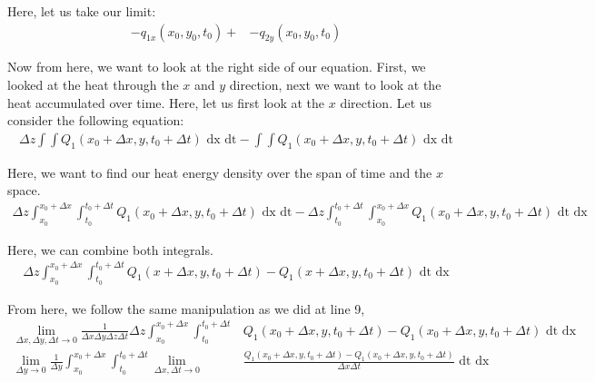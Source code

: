 \documentclass{article}
\begin{document}
\begin{enumerate}
\begin{enumerate}
    Here, let us take our limit:
%
    \begin{align}
      -q_{1x}(x_0, y_0, t_0) + &
      -q_{2y}(x_0, y_0, t_0)
    \end{align}

    Now from here, we want to look at the right side of our equation. First, we looked at the heat through the $x$ and $y$ direction, next we want to look at the heat accumulated over time. Here, let us first look at the $x$ direction. Let us consider the following equation:
%
    \begin{align}
      \Delta z
      \int \int Q_1(x_0 + \Delta x, y, t_0 + \Delta t) \text{ dx dt} - \int \int Q_1(x_0 + \Delta x, y, t_0 + \Delta t) \text{ dx dt}
    \end{align}

    Here, we want to find our heat energy density over the span of time and the $x$ space.
%
    \begin{align}
      \Delta z
      \int^{x_0 + \Delta x}_{x_0}
      \int^{t_0 + \Delta t}_{t_0}
      Q_1(x_0 + \Delta x, y, t_0 + \Delta t) \text{ dx dt} - \Delta z \int^{t_0 + \Delta t}_{t_0} \int^{x_0 + \Delta x}_{x_0} Q_1(x_0 + \Delta x, y, t_0 + \Delta t) \text{ dt dx}
    \end{align}

    Here, we can combine both integrals.
%
    \begin{align}
      \Delta z
      \int^{x_0 + \Delta x}_{x_0}
      \int^{t_0 + \Delta t}_{t_0}
      Q_1(x+\Delta x, y, t_0 + \Delta t) -
      Q_1(x+\Delta x, y, t_0 + \Delta t)
      \text{ dt dx}
    \end{align}

    From here, we follow the same manipulation as we did at line 9,
%
    \begin{align}
      \lim_{\Delta x, \Delta y, \Delta t \to 0} \frac{1}{\Delta x \Delta y \Delta z \Delta t}
      \Delta z
      \int^{x_0 + \Delta x}_{x_0}
      \int^{t_0 + \Delta t}_{t_0}
      & Q_1(x_0 + \Delta x, y, t_0 + \Delta t) -
      Q_1(x_0 + \Delta x, y, t_0 + \Delta t)
      \text{ dt dx}\\
      \lim_{\Delta y \to 0} \frac{1}{\Delta y}
      \int^{x_0 + \Delta x}_{x_0}
      \int^{t_0 + \Delta t}_{t_0}
      \lim_{\Delta x, \Delta t \to 0}
      & \frac{
      Q_1(x_0 + \Delta x, y, t_0 + \Delta t) -
      Q_1(x_0 + \Delta x, y, t_0 + \Delta t)
      }
      {\Delta x \Delta t}
      \text{ dt dx}
    \end{align}


\end{enumerate}
\end{enumerate}
\end{document}
